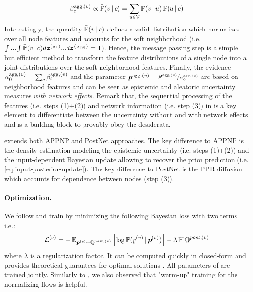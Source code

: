 \begin{equation}\label{eq:agg-evidence-density}
    \beta_c^{\text{agg}, (v)} \propto \bar{\operatorname{\mathbb{P}}}(v \,|\, c) = \sum_{u \in \mathcal{V}} \operatorname{\mathbb{P}}(v \,|\, u) \operatorname{\mathbb{P}}(u \,|\, c)
\end{equation}
Interestingly, the quantity $\bar{\operatorname{\mathbb{P}}}(v \,|\, c)$ defines a valid distribution which normalizes over all node features and accounts for the soft neighborhood (i.e. $\int...\int\bar{\operatorname{\mathbb{P}}}(v \,|\, c) d\bm{z}^{(u_1)}...d\bm{z}^{(u_{|\mathcal{V}|})} = 1$). Hence, the message passing step is a simple but efficient method to transform the feature distributions of a single node into a joint distributions over the soft neighborhood features. Finally, the evidence $\alpha_0^{\text{agg}, (v)} = \sum_c \beta_c^{\text{agg}, (v)}$ and the parameter $\bm{p}^{\text{agg}, (v)} = \nicefrac{\bm{\beta}^{\text{agg}, (v)}}{\alpha_0^{\text{agg}, (v)}}$ are based on neighborhood features and can be seen as epistemic and aleatoric uncertainty measures \emph{with network effects}. Remark that, the sequential processing of the features (i.e. steps (1)+(2)) and network information (i.e. step (3)) in \GPNacro{} is a key element to differentiate between the uncertainty without and with network effects and is a building block to provably obey the desiderata.

\GPNacro{} extends both APPNP \cite{Klicpera2018} and PostNet \cite{charpentier2020} approaches. The key difference to APPNP is the density estimation modeling the epistemic uncertainty (i.e. steps (1)+(2)) and the input-dependent Bayesian update allowing to recover the prior prediction (i.e. \cref{eq:input-posterior-update}). The key difference to PostNet is the PPR diffusion which accounts for dependence between nodes (step (3)).

\paragraph{Optimization.} We follow \cite{charpentier2020} and train \GPNacro{} by minimizing the following Bayesian loss with two terms i.e.:
\begin{equation}
    \operatorname{\mathcal{L}}^{(v)} = -\operatorname{\mathbb{E}}_{\bm{p}^{(v)}\sim \operatorname{\mathbb{Q}}^{post, (v)}}\left[\log \operatorname{\mathbb{P}}(y^{(v)} \,|\, \bm{p}^{(v)})\right] - \lambda \operatorname{\mathbb{H}}{\operatorname{\mathbb{Q}}^{post, (v)}}
\end{equation}
where $\lambda$ is a regularization factor. It can be computed quickly in closed-form and provides theoretical guarantees for optimal solutions \cite{charpentier2020}. All parameters of \GPNacro{} are trained jointly. Similarly to \cite{NatPN2021}, we also observed that "warm-up" training for the normalizing flows is helpful. 